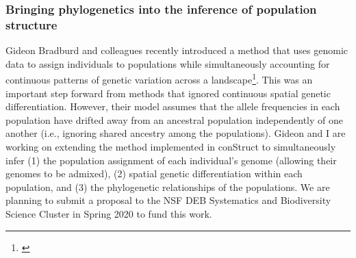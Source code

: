 


\subsubsection*{Bringing phylogenetics into the inference of population structure}
Gideon Bradburd and colleagues recently introduced a method that uses genomic
data to assign individuals to populations while simultaneously accounting for
continuous patterns of genetic variation across a
landscape\footnote{\label{Bradburd18}\hspace{-0.8em}}.
This was an important step forward from methods that ignored continuous spatial
genetic differentiation.
However, their model assumes that the allele frequencies in each population
have drifted away from an ancestral population independently of one another
(i.e., ignoring shared ancestry among the populations).
Gideon and I are working on extending the method implemented in conStruct
to simultaneously infer
(1) the population assignment of each individual's genome (allowing their
genomes to be admixed),
(2) spatial genetic differentiation within each population, and
(3) the phylogenetic relationships of the populations.
We are planning to submit a proposal to the NSF DEB Systematics and
Biodiversity Science Cluster in Spring 2020 to fund this work.



